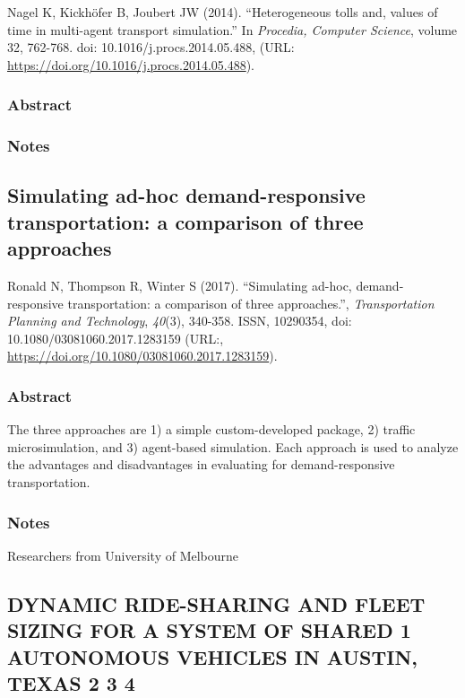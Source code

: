 \documentclass[
]{article}
\begin{document}
Nagel K, Kickhöfer B, Joubert JW (2014). ``Heterogeneous tolls and,
values of time in multi-agent transport simulation.'' In \emph{Procedia,
Computer Science}, volume 32, 762-768. doi: 10.1016/j.procs.2014.05.488,
(URL: \url{https://doi.org/10.1016/j.procs.2014.05.488}).

\hypertarget{abstract-15}{%
\subsubsection{Abstract}\label{abstract-15}}

\hypertarget{notes-15}{%
\subsubsection{Notes}\label{notes-15}}

\hypertarget{simulating-ad-hoc-demand-responsive-transportation-a-comparison-of-three-approaches}{%
\subsection{Simulating ad-hoc demand-responsive transportation: a
comparison of three
approaches}\label{simulating-ad-hoc-demand-responsive-transportation-a-comparison-of-three-approaches}}

Ronald N, Thompson R, Winter S (2017). ``Simulating ad-hoc,
demand-responsive transportation: a comparison of three approaches.'',
\emph{Transportation Planning and Technology}, \emph{40}(3), 340-358.
ISSN, 10290354, doi: 10.1080/03081060.2017.1283159 (URL:,
\url{https://doi.org/10.1080/03081060.2017.1283159}).

\hypertarget{abstract-16}{%
\subsubsection{Abstract}\label{abstract-16}}

The three approaches are 1) a simple custom-developed package, 2)
traffic microsimulation, and 3) agent-based simulation. Each approach is
used to analyze the advantages and disadvantages in evaluating for
demand-responsive transportation.

\hypertarget{notes-16}{%
\subsubsection{Notes}\label{notes-16}}

Researchers from University of Melbourne

\hypertarget{dynamic-ride-sharing-and-fleet-sizing-for-a-system-of-shared-1-autonomous-vehicles-in-austin-texas-2-3-4}{%
\subsection{DYNAMIC RIDE-SHARING AND FLEET SIZING FOR A SYSTEM OF SHARED
1 AUTONOMOUS VEHICLES IN AUSTIN, TEXAS 2 3
4}\label{dynamic-ride-sharing-and-fleet-sizing-for-a-system-of-shared-1-autonomous-vehicles-in-austin-texas-2-3-4}}
\end{document}
